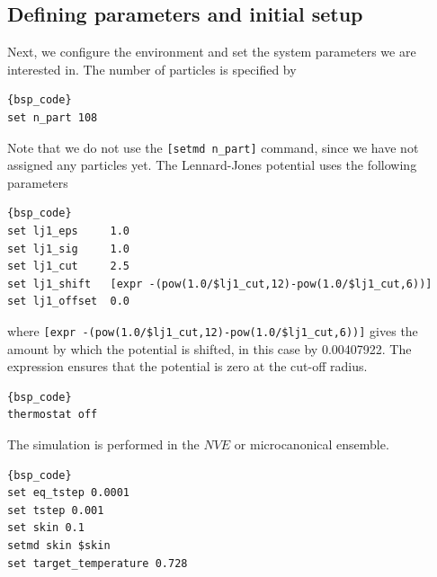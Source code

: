 \documentclass[
paper=a4,                       %
fontsize=11pt,                  %
twoside,                        %
footsepline,                    %
headsepline,                    %
headinclude=false,              %
footinclude=false,              %
pagesize,                       %
]{scrartcl}
\begin{document}
\subsection{Defining parameters and initial setup}

Next, we configure the environment and set the system parameters we are interested in. The number of particles is specified by

{\small\vspace{0,2cm}
\begin{lstlisting}[firstnumber= auto]{bsp_code}
set n_part 108
\end{lstlisting}\vspace{0,2cm}
}

\noindent Note that we do not use the \lstinline|[setmd n_part]| command, since we have not assigned any particles yet. The Lennard-Jones potential uses the following parameters 

{\small\vspace{0,2cm}
\begin{lstlisting}[firstnumber= auto]{bsp_code}
set lj1_eps     1.0
set lj1_sig     1.0
set lj1_cut     2.5
set lj1_shift   [expr -(pow(1.0/$lj1_cut,12)-pow(1.0/$lj1_cut,6))]
set lj1_offset  0.0
\end{lstlisting}\vspace{0,2cm}
}

\noindent where \lstinline|[expr -(pow(1.0/$lj1_cut,12)-pow(1.0/$lj1_cut,6))]| gives the amount by which the potential is shifted, in this case by 0.00407922. The expression ensures that the potential is zero at the cut-off radius. 

{\small\vspace{0,2cm}
\begin{lstlisting}[firstnumber= auto]{bsp_code}
thermostat off
\end{lstlisting}\vspace{0,2cm}
}

\noindent The simulation is performed in the $NVE$ or microcanonical ensemble. 

{\small\vspace{0,2cm}
\begin{lstlisting}[firstnumber= auto]{bsp_code}
set eq_tstep 0.0001
set tstep 0.001
set skin 0.1
setmd skin $skin
set target_temperature 0.728
\end{lstlisting}\vspace{0,2cm}
}
\end{document}
